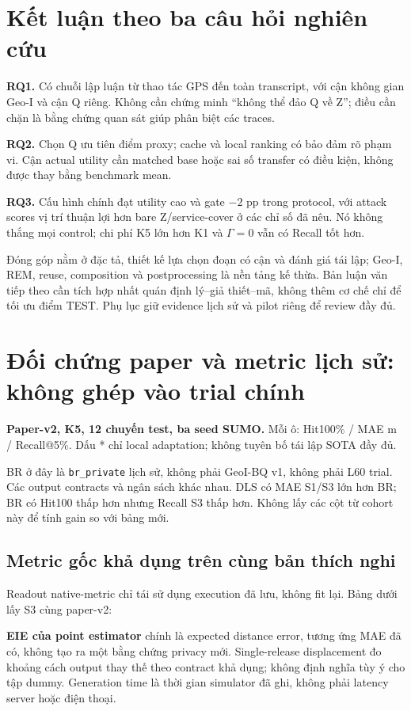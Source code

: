 \documentclass[10pt,a4paper]{article}
\begin{document}
\section{Kết luận theo ba câu hỏi nghiên cứu}
\textbf{RQ1.} Có chuỗi lập luận từ thao tác GPS đến toàn transcript, với cận không gian Geo-I và cận Q riêng.
Không cần chứng minh ``không thể đảo Q về Z''; điều cần chặn là bằng chứng quan sát giúp phân biệt các traces.

\textbf{RQ2.} Chọn Q ưu tiên điểm proxy; cache và local ranking có bảo đảm rõ phạm vi.
Cận actual utility cần matched base hoặc sai số transfer có điều kiện, không được thay bằng benchmark mean.

\textbf{RQ3.} Cấu hình chính đạt utility cao và gate $-2$ pp trong protocol, với attack scores vị trí thuận lợi hơn
bare Z/service-cover ở các chỉ số đã nêu. Nó không thắng mọi control; chi phí K5 lớn hơn K1 và $\Gamma=0$ vẫn có Recall tốt hơn.

Đóng góp nằm ở đặc tả, thiết kế lựa chọn đoạn có cận và đánh giá tái lập; Geo-I, REM, reuse, composition và
postprocessing là nền tảng kế thừa. Bản luận văn tiếp theo cần tích hợp nhất quán định lý--giả thiết--mã,
không thêm cơ chế chỉ để tối ưu điểm TEST. Phụ lục giữ evidence lịch sử và pilot riêng để review đầy đủ.

\clearpage
\appendix
\section{Đối chứng paper và metric lịch sử: không ghép vào trial chính}
\textbf{Paper-v2, K5, 12 chuyến test, ba seed SUMO.} Mỗi ô: Hit100\% / MAE m / Recall@5\%.
Dấu * chỉ local adaptation; không tuyên bố tái lập SOTA đầy đủ.
\begin{small}\end{small}
BR ở đây là \texttt{br\_private} lịch sử, không phải GeoI-BQ v1, không phải L60 trial.
Các output contracts và ngân sách khác nhau. DLS có MAE S1/S3 lớn hơn BR; BR có Hit100 thấp hơn nhưng Recall S3 thấp hơn.
Không lấy các cột từ cohort này để tính gain so với bảng mới.

\subsection{Metric gốc khả dụng trên cùng bản thích nghi}
Readout native-metric chỉ tái sử dụng execution đã lưu, không fit lại. Bảng dưới lấy S3 cùng paper-v2:
\begin{small}\end{small}
\textbf{EIE của point estimator} chính là expected distance error, tương ứng MAE đã có, không tạo ra một bằng chứng privacy mới.
Single-release displacement đo khoảng cách output thay thế theo contract khả dụng; không định nghĩa tùy ý cho tập dummy.
Generation time là thời gian simulator đã ghi, không phải latency server hoặc điện thoại.
\end{document}
